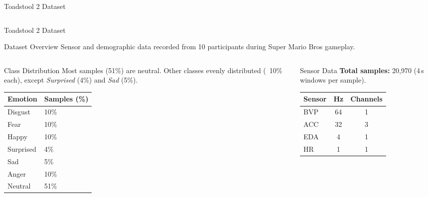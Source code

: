 \begin{frame}{Toadstool 2 Dataset}
\begin{columns}[T]
\begin{column}{0.5\textwidth}
		\end{column}
	\end{columns}
\end{frame}


\begin{frame}{Toadstool 2 Dataset}
	
	\begin{block}{Dataset Overview}
		Sensor and demographic data recorded from 10 participants during Super Mario Bros gameplay. 
	\end{block}
	
	\begin{columns}[T]
		
		\begin{column}{0.48\textwidth}
			\begin{block}{Class Distribution}
				Most samples (51\%) are neutral. Other classes evenly distributed (~10\% each), except \textit{Surprised} (4\%) and \textit{Sad} (5\%).
			\end{block}
			\vspace{1ex}
			\centering
			\small
			\begin{tabular}{ll}
				\toprule
				\textbf{Emotion} & \textbf{Samples (\%)} \\
				\midrule
				Disgust & 10\% \\
				Fear & 10\% \\
				Happy & 10\% \\
				Surprised & 4\% \\
				Sad & 5\% \\
				Anger & 10\% \\
				Neutral & 51\% \\
				\bottomrule
			\end{tabular}
		\end{column}
		
		\begin{column}{0.52\textwidth}
			\begin{block}{Sensor Data}
				\textbf{Total samples:} 20,970 (4\,s windows per sample).
			\end{block}
			\vspace{1ex}
			\centering
			\small
			\begin{tabular}{lcc}
				\toprule
				\textbf{Sensor} & \textbf{Hz} & \textbf{Channels} \\
				\midrule
				BVP & 64 & 1 \\
				ACC & 32 & 3 \\
				EDA & 4 & 1 \\
				HR & 1 & 1 \\
				\bottomrule
			\end{tabular}
		\end{column}
		
	\end{columns}
	
\end{frame}



